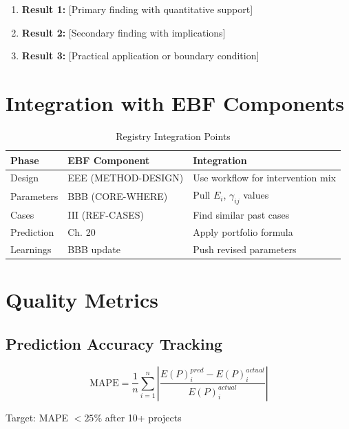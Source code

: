 \begin{enumerate}
    \item \textbf{Result 1:} [Primary finding with quantitative support]
    \item \textbf{Result 2:} [Secondary finding with implications]
    \item \textbf{Result 3:} [Practical application or boundary condition]
\end{enumerate}


\section{Integration with EBF Components}

\begin{table}[h]
\centering
\begin{tabular}{lll}
\toprule
\textbf{Phase} & \textbf{EBF Component} & \textbf{Integration} \\
\midrule
Design & EEE (METHOD-DESIGN) & Use workflow for intervention mix \\
Parameters & BBB (CORE-WHERE) & Pull $E_i$, $\gamma_{ij}$ values \\
Cases & III (REF-CASES) & Find similar past cases \\
Prediction & Ch. 20 & Apply portfolio formula \\
Learnings & BBB update & Push revised parameters \\
\bottomrule
\end{tabular}
\caption{Registry Integration Points}
\end{table}

\section{Quality Metrics}

\subsection{Prediction Accuracy Tracking}

\begin{equation}
\text{MAPE} = \frac{1}{n} \sum_{i=1}^{n} \left| \frac{E(P)_i^{pred} - E(P)_i^{actual}}{E(P)_i^{actual}} \right|
\end{equation}

Target: MAPE $< 25\%$ after 10+ projects

